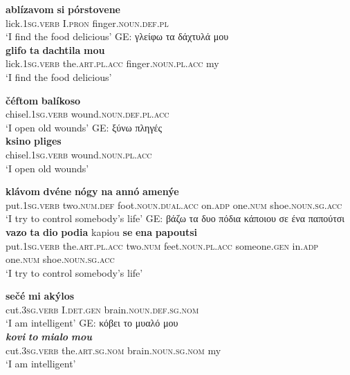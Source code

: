 \documentclass[output=paper,colorlinks,citecolor=brown]{langscibook}
\begin{document}
\ea
\begin{xlist}\label{ex:pomakgreek}
\ex \label{ex:eq1}
\begin{xlist}
\ex
\gll \textbf{{ablízavom}} \textbf{{si}} \textbf{{pórstovene}} \\
{lick}.\textsc{1sg.verb}  I.\textsc{pron} finger.\textsc{noun.def.pl}\\
\glt `I find the food delicious' 
\ex 
GE: γλείφω τα δάχτυλά μου\\
\gll  \textbf{{glifo}} \textbf{{ta}} \textbf{{dachtila}} \textbf{{mou}}\\
 {lick}.\textsc{1sg.verb}  the.\textsc{art.pl.acc} finger.\textsc{noun.pl.acc} my\\
\glt `I find the food delicious' 
\end{xlist}
\ex  \label{ex:eq2}
\begin{xlist}
\ex
\gll \textbf{{čéftom}} \textbf{{balíkoso}}\\
{chisel}.\textsc{1sg.verb} wound.\textsc{noun.def.pl.acc}\\
\glt `I open old wounds' 
\ex 
GE: ξύνω πληγές\\
\gll \textbf{{ksino}} \textbf{{pliges}}\\
{chisel}.\textsc{1sg.verb} wound.\textsc{noun.pl.acc}\\
\glt `I open old wounds' 
\end{xlist}
\ex  \label{ex:eq3}
\begin{xlist}
\ex
\gll \textbf{{klávom}} \textbf{{dvéne}} \textbf{{nógy}} \textbf{{na}} \textbf{{annó}} \textbf{{amenýe}}\\
{put}.\textsc{1sg.verb}  two.\textsc{num.def} foot.\textsc{noun.dual.acc} on.\textsc{adp} one.\textsc{num} shoe.\textsc{noun.sg.acc}\\
\glt `I try to control somebody's life' 
\ex 
GE: βάζω τα δυο πόδια κάποιου σε ένα παπούτσι\\
\gll  \textbf{{vazo}} \textbf{{ta}} \textbf{{dio}} \textbf{{podia}} kapiou \textbf{{se}} \textbf{{ena}} \textbf{{papoutsi}}\\
 {put}.\textsc{1sg.verb} the.\textsc{art.pl.acc} two.\textsc{num} feet.\textsc{noun.pl.acc} someone.\textsc{gen} in.\textsc{adp} one.\textsc{num} shoe.\textsc{noun.sg.acc}\\
\glt `I try to control somebody's life' 
\end{xlist}
\ex \label{ex:eq4}
\begin{xlist}
\ex
\gll \textbf{{sečé}} \textbf{{mi}} \textbf{{akýlos}}\\
cut.\textsc{3sg.verb} I.\textsc{det.gen} brain.\textsc{noun.def.sg.nom}\\
\glt `I am intelligent'
\ex 
GE: κόβει το μυαλό μου\\
\gll \textbf{\em{kovi}} \textbf{\em{to}} \textbf{\em{mialo}} \textbf{\em{mou}}\\
 cut.\textsc{3sg.verb} the.\textsc{art.sg.nom} brain.\textsc{noun.sg.nom} my\\
\glt `I am intelligent'
\end{xlist}
\end{xlist}
\z
\end{document}
